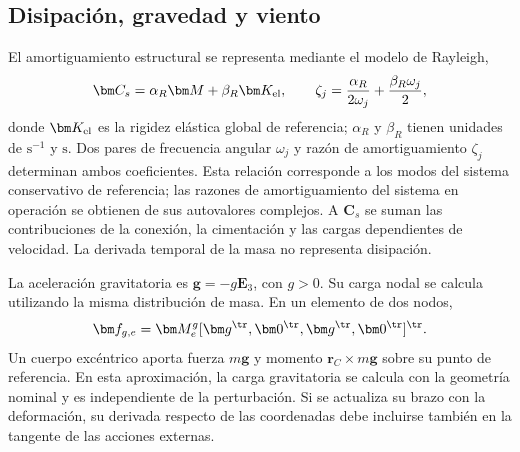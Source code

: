 \subsection{Disipación, gravedad y viento}
El amortiguamiento estructural se representa mediante el modelo de Rayleigh,
\begin{equation}
\bm C_s=\alpha_R\bm M+\beta_R\bm K_{\rm el},\qquad
\zeta_j=\frac{\alpha_R}{2\omega_j}+\frac{\beta_R\omega_j}{2},
\end{equation}
donde $\bm K_{\rm el}$ es la rigidez elástica global de referencia; $\alpha_R$ y $\beta_R$ tienen unidades de $\mathrm{s^{-1}}$ y $\mathrm{s}$. Dos pares de frecuencia angular $\omega_j$ y razón de amortiguamiento $\zeta_j$ determinan ambos coeficientes. Esta relación corresponde a los modos del sistema conservativo de referencia; las razones de amortiguamiento del sistema en operación se obtienen de sus autovalores complejos. A $\bm C_s$ se suman las contribuciones de la conexión, la cimentación y las cargas dependientes de velocidad. La derivada temporal de la masa no representa disipación.

La aceleración gravitatoria es $\bm g=-g\bm E_3$, con $g>0$. Su carga nodal se calcula utilizando la misma distribución de masa. En un elemento de dos nodos,
\begin{equation}
\bm f_{g,e}=\bm M_e^g[\bm g^\tr,\bm0^\tr,\bm g^\tr,\bm0^\tr]^\tr.
\end{equation}
Un cuerpo excéntrico aporta fuerza $m\bm g$ y momento $\bm r_C\times m\bm g$ sobre su punto de referencia. En esta aproximación, la carga gravitatoria se calcula con la geometría nominal y es independiente de la perturbación. Si se actualiza su brazo con la deformación, su derivada respecto de las coordenadas debe incluirse también en la tangente de las acciones externas.

